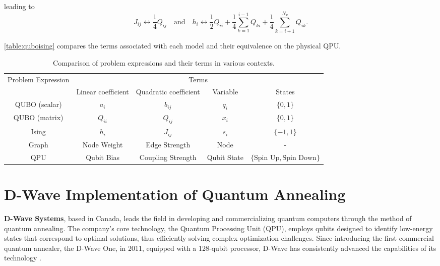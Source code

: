 leading to 
\begin{equation}
J_{ij} \leftrightarrow \frac{1}{4}Q_{ij} \quad \text{and} \quad h_i \leftrightarrow \frac{1}{2}Q_{ii} + \frac{1}{4} \sum_{k=1}^{i-1} Q_{ki} + \frac{1}{4} \sum_{k=i+1}^{N_v} Q_{ik}.
\end{equation}

 \autoref{table:quboising} compares the terms associated with each model and their equivalence on the physical QPU.
\begin{table}[h]
    \centering
    \caption{Comparison of problem expressions and their terms in various contexts.}
    \label{table:quboising}
    \begin{tabular}{@{}ccccc@{}}
        \toprule
        \multirow{2}{*}{Problem Expression} & \multicolumn{4}{c}{Terms} \\ 
        \cmidrule(lr){2-5} %
        & Linear coefficient & Quadratic coefficient & Variable & States \\
        \midrule
        QUBO (scalar) & \(a_i\) & \(b_{ij}\) & \(q_i\) & \(\{0, 1\}\) \\
        QUBO (matrix) & \(Q_{ii}\) & \(Q_{ij}\) & \(x_i\) & \(\{0, 1\}\) \\
        Ising & \(h_i\) & \(J_{ij}\) & \(s_i\) & \(\{-1, 1\}\) \\
        Graph & Node Weight & Edge Strength & Node & - \\
        QPU & Qubit Bias & Coupling Strength & Qubit State & \(\{\text{Spin Up}, \text{Spin Down}\}\) \\
        \bottomrule
    \end{tabular}
\end{table}

\section{D-Wave Implementation of Quantum Annealing }

\textbf{D-Wave Systems}, based in Canada, leads the field in developing and commercializing quantum computers through the method of quantum annealing. 
The company's core technology, the Quantum Processing Unit (QPU), employs qubits designed to identify low-energy states that correspond to optimal solutions, thus efficiently solving complex optimization challenges. Since introducing the first commercial quantum annealer, the D-Wave One, in 2011, equipped with a 128-qubit processor, D-Wave has consistently advanced the capabilities of its technology \cite{dwavearticle}.



